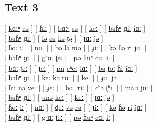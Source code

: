 \documentclass[17pt]{extarticle}
\begin{document}
\subsection*{\textbf{Text 3}}

\hspace{0.7cm}[ \underline{kɑːⁿ} \underline{cə} ] [ \underline{ɦiː} ] [ \underline{bɑːⁿ} \underline{sə} ] [ \underline{keː} ] [ \underline{bəɦⁿ} \underline{ɡiː} \underline{jɑː} ]\\

[ \underline{bəɦⁿ} \underline{ɡiː} ] [ \underline{lə} \underline{cə} \underline{kə} \underline{t̪ə} ] [ \underline{ɟɑː} \underline{jə} ]\\

[ \underline{ɦoː} \underline{iː} ] [ \underline{nɑː} ] [ \underline{bə} \underline{lə} \underline{mə} ] [ \underline{ɟiː} ] [ \underline{kə} \underline{ɦə} \underline{ri} \underline{jɑː} ]\\

[ \underline{bəɦⁿ} \underline{ɡiː} ] [ \underline{gʰɑː} \underline{ʈeː} ] [ \underline{pə} \underline{ɦuⁿ} \underline{cɑː} \underline{iː} ]\\

[ \underline{bɑː} \underline{ʈeː} ] [ \underline{ɟeː} ] [ \underline{pu} \underline{cʰeː} \underline{lɑː} ] [ \underline{bə} \underline{ʈoː} \underline{ɦi} \underline{jɑː} ]\\

[ \underline{bəɦⁿ} \underline{ɡiː} ] [ \underline{keː} \underline{kə} \underline{rɑː} ] [ \underline{keː} ] [ \underline{ɟɑː} \underline{jə} ]\\

[ \underline{ɦu} \underline{nə} \underline{veː} ] [ \underline{ɟeː} ] [ \underline{bɑː} \underline{riː} ] [ \underline{cʰə} \underline{ʈʰiː} ] [ \underline{maːi} \underline{jɑː} ]\\

[ \underline{bəɦⁿ} \underline{ɡiː} ] [ \underline{unə} \underline{keː} ] [ \underline{keː} ] [ \underline{ɟɑː} \underline{jə} ]\\

[ \underline{ɦoː} \underline{iː} ] [ \underline{nɑː} ] [ \underline{d̪eː} \underline{və} \underline{rə} ] [ \underline{ɟiː} ]
[ \underline{kə} \underline{ɦə} \underline{ri} \underline{jɑː} ]\\

[ \underline{bəɦⁿ} \underline{ɡiː} ] [ \underline{gʰɑː} \underline{ʈeː} ] [ \underline{pə} \underline{ɦuⁿ} \underline{cɑː} \underline{iː} ]\\
\end{document}
